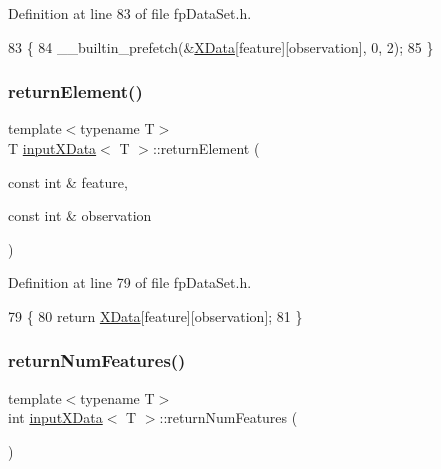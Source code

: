 Definition at line 83 of file fp\+Data\+Set.\+h.


\begin{DoxyCode}
83                                                                       \{
84                             \_\_builtin\_prefetch(&\hyperlink{classinputXData_aff55a72217a7a3b66df91d01840e4206}{XData}[feature][observation], 0, 2);
85         \}
\end{DoxyCode}
\mbox{\label{classinputXData_a5eb6d788b282751f279605495351c42f}} 
\subsubsection{\texorpdfstring{return\+Element()}{returnElement()}}
{\footnotesize\ttfamily template$<$typename T$>$ \\
T \hyperlink{classinputXData}{input\+X\+Data}$<$ T $>$\+::return\+Element (\begin{DoxyParamCaption}\item[{const int \&}]{feature,  }\item[{const int \&}]{observation }\end{DoxyParamCaption})\hspace{0.3cm}{\ttfamily [inline]}}



Definition at line 79 of file fp\+Data\+Set.\+h.


\begin{DoxyCode}
79                                                                          \{
80             \textcolor{keywordflow}{return} \hyperlink{classinputXData_aff55a72217a7a3b66df91d01840e4206}{XData}[feature][observation];
81         \}
\end{DoxyCode}
\mbox{\label{classinputXData_ad10e112909314a795628784bb9fc7e8b}} 
\subsubsection{\texorpdfstring{return\+Num\+Features()}{returnNumFeatures()}}
{\footnotesize\ttfamily template$<$typename T$>$ \\
int \hyperlink{classinputXData}{input\+X\+Data}$<$ T $>$\+::return\+Num\+Features (\begin{DoxyParamCaption}{ }\end{DoxyParamCaption})\hspace{0.3cm}{\ttfamily [inline]}}



